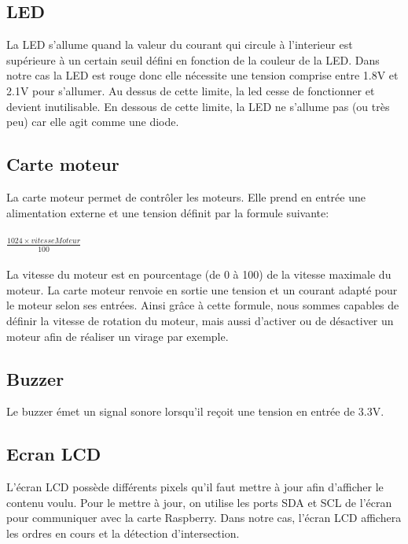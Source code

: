     \subsection{LED}

        La LED s'allume quand la valeur du courant qui circule à l'interieur est supérieure à un certain seuil défini en fonction de la couleur de la LED. Dans notre cas la LED est rouge donc elle nécessite une tension comprise entre 1.8V et 2.1V pour s'allumer. Au dessus de cette limite, la led cesse de fonctionner et devient inutilisable. En dessous de cette limite, la LED ne s'allume pas (ou très peu) car elle agit comme une diode. 

    \subsection{Carte moteur}

        La carte moteur permet de contrôler les moteurs. Elle prend en entrée une alimentation externe et une tension définit par la formule suivante: \\ \\ $\frac{1024 \times vitesseMoteur}{100}$ \\ \\ La vitesse du moteur est en pourcentage (de 0 à 100) de la vitesse maximale du moteur. La carte moteur renvoie en sortie une tension et un courant adapté pour le moteur selon ses entrées. Ainsi grâce à cette formule, nous sommes capables de définir la vitesse de rotation du moteur, mais aussi d'activer ou de désactiver un moteur afin de réaliser un virage par exemple.
        
    \subsection{Buzzer}

        Le buzzer émet un signal sonore lorsqu'il reçoit une tension en entrée de 3.3V. 

    \subsection{Ecran LCD}

        L'écran LCD possède différents pixels qu'il faut mettre à jour afin d'afficher le contenu voulu. Pour le mettre à jour, on utilise les ports SDA et SCL de l'écran pour communiquer avec la carte Raspberry. Dans notre cas, l'écran LCD affichera les ordres en cours et la détection d'intersection. 
    
